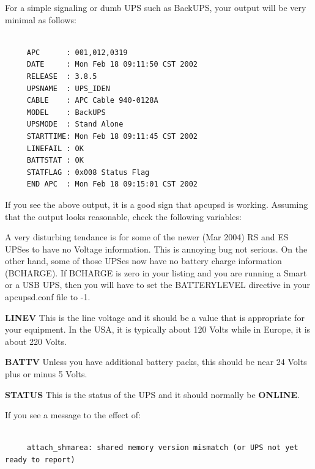 {{For a simple signaling or dumb UPS such as BackUPS, your output will be very
minimal as follows: 

\footnotesize
\begin{verbatim}
     
     APC      : 001,012,0319
     DATE     : Mon Feb 18 09:11:50 CST 2002
     RELEASE  : 3.8.5
     UPSNAME  : UPS_IDEN
     CABLE    : APC Cable 940-0128A
     MODEL    : BackUPS
     UPSMODE  : Stand Alone
     STARTTIME: Mon Feb 18 09:11:45 CST 2002
     LINEFAIL : OK
     BATTSTAT : OK
     STATFLAG : 0x008 Status Flag
     END APC  : Mon Feb 18 09:15:01 CST 2002
\end{verbatim}
\normalsize

If you see the above output, it is a good sign that apcupsd is working.
Assuming that the output looks reasonable, check the following variables:  

A very disturbing tendance is for some of the newer (Mar 2004) RS and ES UPSes
to have no Voltage information.  This is annoying bug not serious.  On the
other hand, some of those UPSes now have no battery charge information
(BCHARGE).  If BCHARGE is zero in your listing and you are running a Smart or
a USB UPS, then you will have to set the BATTERYLEVEL directive in your
apcupsd.conf file to -1.  

\begin{description}

\item {\bf LINEV}
This is the line voltage and it should be a value that is appropriate for your
equipment. In the USA, it is typically about 120 Volts while in Europe, it is
about 220 Volts.  

\item {\bf BATTV}
Unless you have additional battery packs, this should be near 24 Volts plus or
minus 5 Volts.  

\item {\bf STATUS}
This is the status of the UPS and it should normally be {\bf ONLINE}. 
\end{description}

If you see a message to the effect of: 

\footnotesize
\begin{verbatim}
     
     attach_shmarea: shared memory version mismatch (or UPS not yet ready to report)
\end{verbatim}
\normalsize

}}
